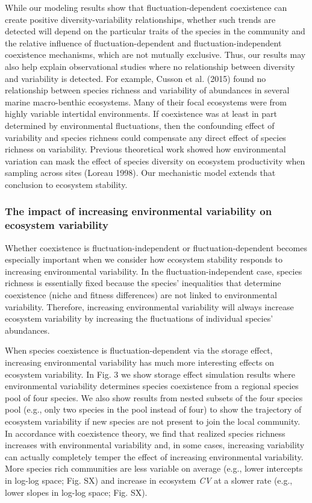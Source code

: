 \documentclass[12pt,]{article}
\begin{document}
While our modeling results show that fluctuation-dependent coexistence
can create positive diversity-variability relationships, whether such
trends are detected will depend on the particular traits of the species
in the community and the relative influence of fluctuation-dependent and
fluctuation-independent coexistence mechanisms, which are not mutually
exclusive. Thus, our results may also help explain observational studies
where no relationship between diversity and variability is detected. For
example, Cusson et al. (2015) found no relationship between species
richness and variability of abundances in several marine macro-benthic
ecosystems. Many of their focal ecosystems were from highly variable
intertidal environments. If coexistence was at least in part determined
by environmental fluctuations, then the confounding effect of
variability and species richness could compensate any direct effect of
species richness on variability. Previous theoretical work showed how
environmental variation can mask the effect of species diversity on
ecosystem productivity when sampling across sites (Loreau 1998). Our
mechanistic model extends that conclusion to ecosystem stability.

\subsubsection{The impact of increasing environmental variability on
ecosystem
variability}\label{the-impact-of-increasing-environmental-variability-on-ecosystem-variability}

Whether coexistence is fluctuation-independent or fluctuation-dependent
becomes especially important when we consider how ecosystem stability
responds to increasing environmental variability. In the
fluctuation-independent case, species richness is essentially fixed
because the species' inequalities that determine coexistence (niche and
fitness differences) are not linked to environmental variability.
Therefore, increasing environmental variability will always increase
ecosystem variability by increasing the fluctuations of individual
species' abundances.

When species coexistence is fluctuation-dependent via the storage
effect, increasing environmental variability has much more interesting
effects on ecosystem variability. In Fig. 3 we show storage effect
simulation results where environmental variability determines species
coexistence from a regional species pool of four species. We also show
results from nested subsets of the four species pool (e.g., only two
species in the pool instead of four) to show the trajectory of ecosystem
variability if new species are not present to join the local community.
In accordance with coexistence theory, we find that realized species
richness increases with environmental variability and, in some cases,
increasing variability can actually completely temper the effect of
increasing environmental variability. More species rich communities are
less variable on average (e.g., lower intercepts in log-log space; Fig.
SX) and increase in ecosystem \emph{CV} at a slower rate (e.g., lower
slopes in log-log space; Fig. SX).
\end{document}
